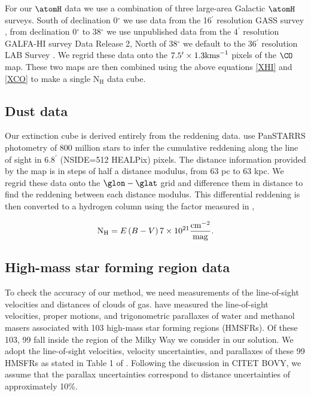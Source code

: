 For our $\atomH$ data we use a combination of three large-area Galactic $\atomH$ surveys. 
South of declination 0$^\circ$ we use data from the 16$^\prime$ resolution GASS survey \citep{Kalberla_2010}, from declination 0$^\circ$ to 38$^\circ$ we use unpublished data from the 4$^\prime$ resolution GALFA-HI survey \citep{Peek_2011} Data Release 2, North of 38$^\circ$ we default to the 36$^\prime$ resolution LAB Survey \citep{Kalberla_2005}. 
We regrid these data onto the $7.5^\prime \times 1.3 {\rm km s}^{-1}$ pixels of the \citet{Dame_2001} $\CO$ map.
These two maps are then combined using the above equations \ref{XHI} and \ref{XCO} to make a single $\mathrm{N_H}$ data cube.


\subsection{Dust data}

Our extinction cube is derived entirely from the \citet{Green_2015} reddening data. 
\citet{Green_2015} use PanSTARRS photometry of 800 million stars to infer the cumulative reddening along the line of sight in 6.8$^\prime$ (NSIDE=512 HEALPix) pixels. 
The distance information provided by the \citet{Green_2015} map is in steps of half a distance modulus, from 63 pc to 63 kpc. 
We regrid these data onto the \citet{Dame_2001} $\glon-\glat$ grid and difference them in distance to find the reddening between each distance modulus. 
This differential reddening is then converted to a hydrogen column using the factor measured in \citet{Peek_2013}, 

\begin{equation}
\mathrm{N_H} = E\left(B-V\right) 7 \times 10^{21} \frac{\rm cm^{-2} }{\rm mag}. 
\end{equation}


\subsection{High-mass star forming region data}
\label{sec:data-HMSFR}
To check the accuracy of our method, we need measurements of the line-of-sight velocities and distances of clouds of gas. 
\Reid{} have measured the line-of-sight velocities, proper motions, and trigonometric parallaxes of water and methanol masers associated with 103 high-mass star forming regions (HMSFRs). 
Of these 103, 99 fall inside the region of the Milky Way we consider in our solution.
We adopt the line-of-sight velocities, velocity uncertainties, and parallaxes of these 99 HMSFRs as stated in Table 1 of \Reid{}. 
Following the discussion in CITET BOVY, we assume that the parallax uncertainties correspond to distance uncertainties of approximately 10\%. 
